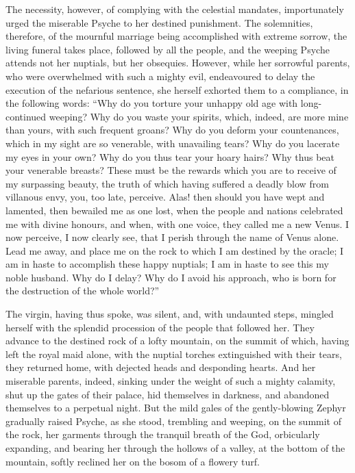 \documentclass[12pt]{article}
\begin{document}
The necessity, however, of complying with the celestial mandates, importunately
urged the miserable Psyche to her destined punishment. The solemnities,
therefore, of the mournful marriage being accomplished with extreme sorrow, the
living funeral takes place, followed by all the people, and the weeping Psyche
attends not her nuptials, but her obsequies. However, while her sorrowful
parents, who were overwhelmed with such a mighty evil, endeavoured to delay the
execution of the nefarious sentence, she herself exhorted them to a compliance,
in the following words: ``Why do you torture your unhappy old age with
long-continued weeping? Why do you waste your spirits, which, indeed, are more
mine than yours, with such frequent groans? Why do you deform your
countenances, which in my sight are so venerable, with unavailing tears? Why do
you lacerate my eyes in your own? Why do you thus tear your hoary hairs? Why
thus beat your venerable breasts? These must be the rewards which you are to
receive of my surpassing beauty, the truth of which having suffered a deadly
blow from villanous envy, you, too late, perceive. Alas! then should you have
wept and lamented, then bewailed me as one lost, when the people and nations
celebrated me with divine honours, and when, with one voice, they called me a
new Venus. I now perceive, I now clearly see, that I perish through the name of
Venus alone. Lead me away, and place me on the rock to which I am destined by
the oracle; I am in haste to accomplish these happy nuptials; I am in haste to
see this my noble husband. Why do I delay? Why do I avoid his approach, who is
born for the destruction of the whole world?''

The virgin, having thus spoke, was silent, and, with undaunted steps, mingled
herself with the splendid procession of the people that followed her. They
advance to the destined rock of a lofty mountain, on the summit of which,
having left the royal maid alone, with the nuptial torches extinguished with
their tears, they returned home, with dejected heads and desponding hearts. And
her miserable parents, indeed, sinking under the weight of such a mighty
calamity, shut up the gates of their palace, hid themselves in darkness, and
abandoned themselves to a perpetual night. But the mild gales of the
gently-blowing Zephyr gradually raised Psyche, as she stood, trembling and
weeping, on the summit of the rock, her garments through the tranquil breath of
the God, orbicularly expanding, and bearing her through the hollows of a
valley, at the bottom of the mountain, softly reclined her on the bosom of a
flowery turf.
\end{document}
